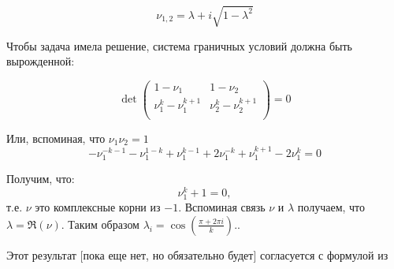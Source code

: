 \begin{equation}
	\nu_{1,2} = \lambda + i \sqrt{1 - \lambda^2}
\end{equation}

Чтобы задача имела решение, система граничных условий должна быть вырожденной:

\begin{equation}
	\det \begin{pmatrix} 
	1 - \nu_1 & 1 - \nu_2 \\
	\nu_1^k - \nu_1^{k+1} &  \nu_2^k - \nu_2^{k+1} \\
	\end{pmatrix} = 0
\end{equation}

Или, вспоминая, что $\nu_1 \nu_2 = 1$
\begin{equation}
-\nu_1^{-k-1}-\nu_1 ^{1-k}+\nu_1 ^{k-1}+2 \nu_1 ^{-k}+\nu_1 ^{k+1}-2 \nu_1 ^k=0
\end{equation}

Получим, что:
\begin{equation}
\nu_1^k+1=0,
\end{equation}
т.е. $\nu$ это комплексные корни из $-1$. Вспоминая связь $\nu$ и $\lambda$ получаем, что $\lambda = \Re(\nu)$. Таким образом $\lambda_i = \cos(\frac{\pi + 2\pi i}{k}).$.

Этот результат [пока еще нет, но обязательно будет] согласуется с формулой из \cite{farhi1993correlation}
